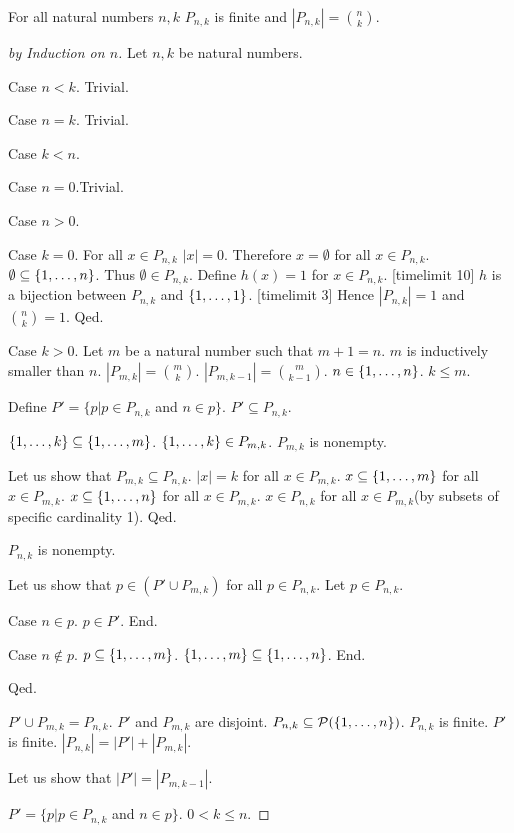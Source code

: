 \documentclass{article}
\begin{document}
\begin{forthel}
\begin{theorem}
For all natural numbers $n,k$  $P_{n,k}$ is finite and $|P_{n,k}|= \binom{n}{k}$.
\end{theorem}
\begin{proof}[by Induction on $n$]
Let $n,k$ be natural numbers.

Case $n < k$. Trivial.

Case $n = k$. Trivial.

Case $k < n$.

Case $n=0$.Trivial.

Case $n>0$.

Case $k=0$.
For all $x \in P_{n,k}$ $|x| = 0$.
Therefore $x = \emptyset$ for all $x \in P_{n,k}$.
$\emptyset \subseteq \{1,\dots,n\}$. Thus $\emptyset \in P_{n,k}$.
Define $h(x) = 1$ for $x \in P_{n,k}$. 
[timelimit 10]
$h$ is a bijection between $P_{n,k}$ and $\{1,\dots,1\}$.
[timelimit 3]
Hence $|P_{n,k}| = 1$ and $\binom{n}{k} = 1$.
Qed.

Case $k>0$.
Let $m$ be a natural number such that $m+1=n$.
$m$ is inductively smaller than $n$.
$|P_{m,k}|=\binom{m}{k}$.
$|P_{m,k-1}|=\binom{m}{k-1}$.
$n \in \{1,\dots,n\}$.
$k \leq m$.

Define $P' = \{p| p \in P_{n,k}$ and $n \in p\}$.
$P' \subseteq P_{n,k}$. 


$\{1,\dots,k\} \subseteq \{1,\dots,m\}$.
$\{1,\dots,k\} \in P_{m,k}$.
$P_{m,k}$ is nonempty.

Let us show that $P_{m,k} \subseteq P_{n,k}$.
$|x|=k$ for all $x \in P_{m,k}$.
$x \subseteq \{1,\dots,m\}$ for all $x \in P_{m,k}$.
$x \subseteq \{1,\dots,n\}$ for all $x \in P_{m,k}$.
$x \in P_{n,k}$ for all $x \in P_{m,k}$(by subsets of specific cardinality 1).
Qed.

$P_{n,k}$ is nonempty.

Let us show that $p \in (P' \cup P_{m,k})$ for all $p \in P_{n,k}$.
Let $p \in P_{n,k}$.

Case $n \in p$.
$p \in P'$. End.

Case $n \notin p$.
$p \subseteq \{1,\dots,m\}$.
$\{1,\dots,m\} \subseteq \{1,\dots,n\}$.
End.

Qed.

$P' \cup P_{m,k} = P_{n,k}$.
$P'$ and $P_{m,k}$ are disjoint.
$P_{n,k} \subseteq {\cal P}(\{1,\dots,n\})$.
$P_{n,k}$ is finite.
$P'$ is finite.
$|P_{n,k}|=|P'|+|P_{m,k}|$.

Let us show that $|P'|=|P_{m,k-1}|$.

$P' = \{p| p \in P_{n,k}$ and $n \in p\}$. 
$0 < k \leq n$.


\end{proof}
\end{forthel}
\end{document}
